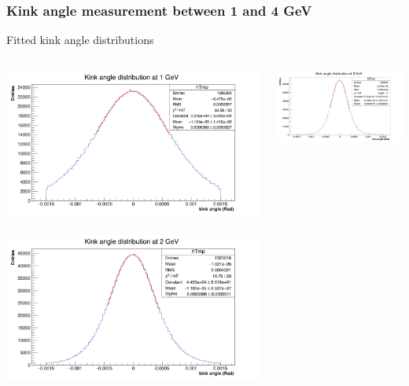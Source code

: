 \documentclass{beamer}
\begin{document}
  \begin{frame}
    \frametitle{Kink angle measurement between 1 and 4 GeV}

    \begin{block}{Fitted kink angle distributions}
      \begin{columns}[c]
        \begin{column}{5cm}
          \centering
          \includegraphics[width = \textwidth]{Pictures/kinkAngle1GeV.png}
          \
          \includegraphics[width = \textwidth]{Pictures/kinkAngle2GeV.png} 
        \end{column} 
        \begin{column}{5cm}
          \centering
          \includegraphics[width = \textwidth]{Pictures/kinkAngle3GeV.png}

\end{column}
\end{columns}
\end{block}
\end{frame}
\end{document}
